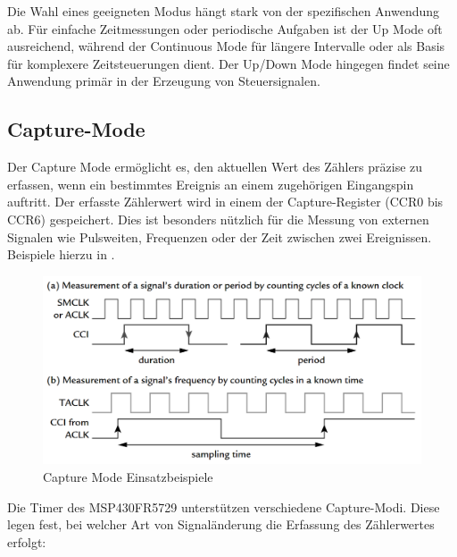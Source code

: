 Die Wahl eines geeigneten Modus h\"angt stark von der spezifischen Anwendung ab. F\"ur einfache Zeitmessungen oder periodische Aufgaben ist der Up Mode oft ausreichend, w\"ahrend der Continuous Mode f\"ur l\"angere Intervalle oder als Basis f\"ur komplexere Zeitsteuerungen dient. Der Up/Down Mode hingegen findet seine Anwendung prim\"ar in der Erzeugung von Steuersignalen.

\subsection{Capture-Mode}
\label{sec:Timer_CaptureMode}

Der Capture Mode erm\"oglicht es, den aktuellen Wert des Z\"ahlers pr\"azise zu erfassen, wenn ein bestimmtes Ereignis an einem zugeh\"origen Eingangspin auftritt. Der erfasste Z\"ahlerwert wird in einem der Capture-Register (CCR0 bis CCR6) gespeichert. Dies ist besonders n\"utzlich f\"ur die Messung von externen Signalen wie Pulsweiten, Frequenzen oder der Zeit zwischen zwei Ereignissen. Beispiele hierzu in .

\begin{figure}[h!]
	\centering
	\includegraphics[width=1.0\textwidth]{../Bilder/CaptureMode_Beispiele.png}
	\caption{Capture Mode Einsatzbeispiele\\}
	\label{fig:CaptureModeBeispiele}
\end{figure}

Die Timer des MSP430FR5729 unterst\"utzen verschiedene Capture-Modi. Diese legen fest, bei welcher Art von Signal\"anderung die Erfassung des Z\"ahlerwertes erfolgt:

